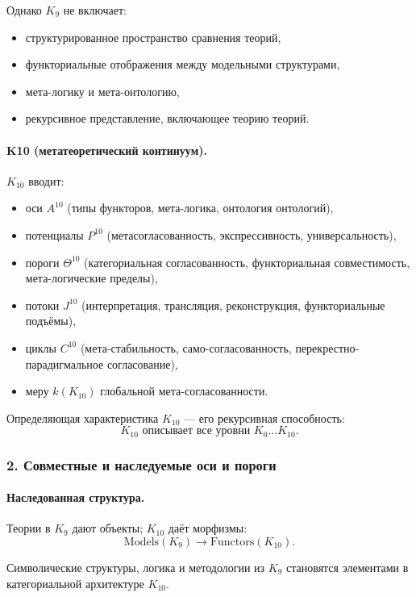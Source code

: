 Однако $K_9$ не включает:
\begin{itemize}
  \item структурированное пространство сравнения теорий,
  \item функториальные отображения между модельными структурами,
  \item мета-логику и мета-онтологию,
  \item рекурсивное представление, включающее теорию теорий.
\end{itemize}

\paragraph{K10 (метатеоретический континуум).}
$K_{10}$ вводит:
\begin{itemize}
  \item оси $A^{10}$ (типы функторов, мета-логика, онтология онтологий),
  \item потенциалы $P^{10}$ (метасогласованность, экспрессивность, универсальность),
  \item пороги $\Theta^{10}$ (категориальная согласованность, функториальная
        совместимость, мета-логические пределы),
  \item потоки $J^{10}$ (интерпретация, трансляция, реконструкция,
        функториальные подъёмы),
  \item циклы $C^{10}$ (мета-стабильность, само-согласованность,
        перекрестно-парадигмальное согласование),
  \item меру $k(K_{10})$ глобальной мета-согласованности.
\end{itemize}

Определяющая характеристика $K_{10}$ — его рекурсивная способность:
\[
K_{10} \text{ описывает все уровни } K_0\dots K_{10}.
\]

\subsubsection{2. Совместные и наследуемые оси и пороги}

\paragraph{Наследованная структура.}
Теории в $K_9$ дают объекты; $K_{10}$ даёт морфизмы:
\[
\text{Models}(K_9) \rightarrow \text{Functors}(K_{10}).
\]

Символические структуры, логика и методологии из $K_9$ становятся элементами в
категориальной архитектуре $K_{10}$.

